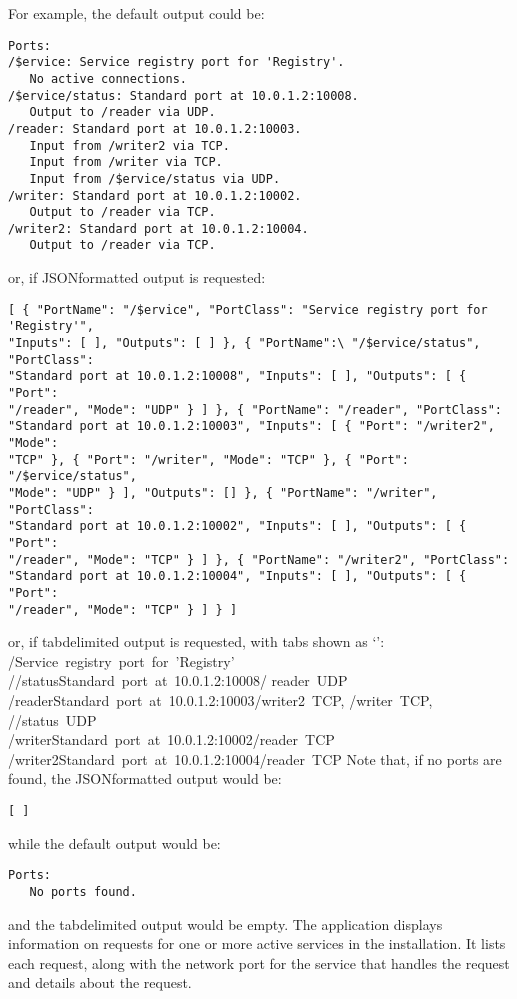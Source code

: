 For example, the default output could be:
\outputBegin
\begin{verbatim}
Ports:
/$ervice: Service registry port for 'Registry'.
   No active connections.
/$ervice/status: Standard port at 10.0.1.2:10008.
   Output to /reader via UDP.
/reader: Standard port at 10.0.1.2:10003.
   Input from /writer2 via TCP.
   Input from /writer via TCP.
   Input from /$ervice/status via UDP.
/writer: Standard port at 10.0.1.2:10002.
   Output to /reader via TCP.
/writer2: Standard port at 10.0.1.2:10004.
   Output to /reader via TCP.
\end{verbatim}
\outputEnd
\condPage{}
or, if JSON\longDash{}formatted output is requested:
\outputBegin
\begin{verbatim}
[ { "PortName": "/$ervice", "PortClass": "Service registry port for 'Registry'",
"Inputs": [ ], "Outputs": [ ] }, { "PortName":\ "/$ervice/status", "PortClass":
"Standard port at 10.0.1.2:10008", "Inputs": [ ], "Outputs": [ { "Port":
"/reader", "Mode": "UDP" } ] }, { "PortName": "/reader", "PortClass":
"Standard port at 10.0.1.2:10003", "Inputs": [ { "Port": "/writer2", "Mode":
"TCP" }, { "Port": "/writer", "Mode": "TCP" }, { "Port": "/$ervice/status",
"Mode": "UDP" } ], "Outputs": [] }, { "PortName": "/writer", "PortClass":
"Standard port at 10.0.1.2:10002", "Inputs": [ ], "Outputs": [ { "Port":
"/reader", "Mode": "TCP" } ] }, { "PortName": "/writer2", "PortClass":
"Standard port at 10.0.1.2:10004", "Inputs": [ ], "Outputs": [ { "Port":
"/reader", "Mode": "TCP" } ] } ]
\end{verbatim}
\outputEnd{}
or, if tab\longDash{}delimited output is requested, with tabs shown as `\tabSymbol':
\outputBegin{}
/\dollarService\pseudotab{}Service~registry~port~for~'Registry'\\		
/\dollarService/status\pseudotab{}Standard~port~at~10.0.1.2:10008\pseudotab/%
reader~UDP\\
/reader\pseudotab{}Standard~port~at~10.0.1.2:10003\pseudotab/writer2~TCP,
/writer~TCP,\\
\hspace*{2em}/\dollarService/status~UDP\\
/writer\pseudotab{}Standard~port~at~10.0.1.2:10002\pseudotab/reader~TCP\\
/writer2\pseudotab{}Standard~port~at~10.0.1.2:10004\pseudotab/reader~TCP
\outputEnd{}
Note that, if no ports are found, the JSON\longDash{}formatted output would be:
\outputBegin
\begin{verbatim}
[ ]
\end{verbatim}
\outputEnd{}
while the default output would be:
\outputBegin
\begin{verbatim}
Ports:
   No ports found.
\end{verbatim}
\outputEnd{}
and the tab\longDash{}delimited output would be empty.
The application  displays information on requests for one or
more active services in the \mplusm{} installation.
It lists each request, along with the \yarp{} network port for the service that handles
the request and details about the request.\\

